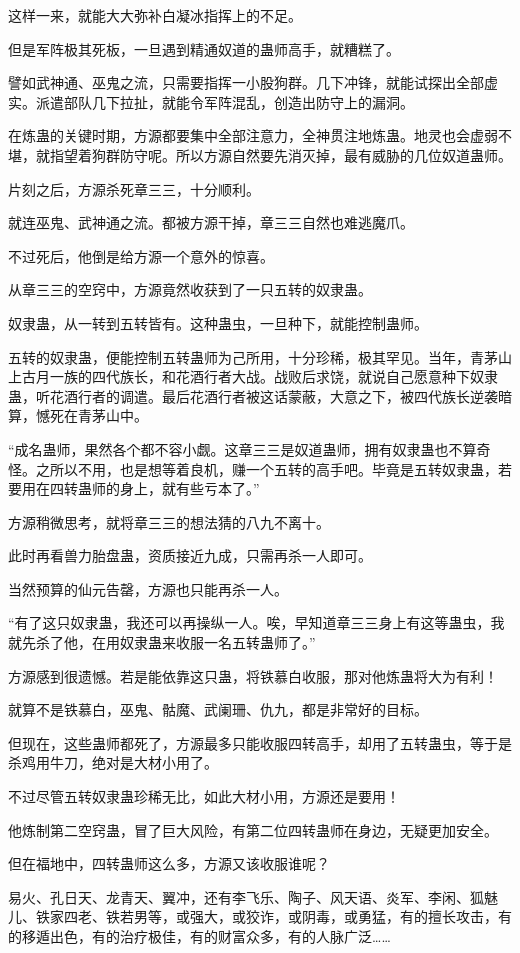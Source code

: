 \begin{this_body}
这样一来，就能大大弥补白凝冰指挥上的不足。

但是军阵极其死板，一旦遇到精通奴道的蛊师高手，就糟糕了。

譬如武神通、巫鬼之流，只需要指挥一小股狗群。几下冲锋，就能试探出全部虚实。派遣部队几下拉扯，就能令军阵混乱，创造出防守上的漏洞。

在炼蛊的关键时期，方源都要集中全部注意力，全神贯注地炼蛊。地灵也会虚弱不堪，就指望着狗群防守呢。所以方源自然要先消灭掉，最有威胁的几位奴道蛊师。

片刻之后，方源杀死章三三，十分顺利。

就连巫鬼、武神通之流。都被方源干掉，章三三自然也难逃魔爪。

不过死后，他倒是给方源一个意外的惊喜。

从章三三的空窍中，方源竟然收获到了一只五转的奴隶蛊。

奴隶蛊，从一转到五转皆有。这种蛊虫，一旦种下，就能控制蛊师。

五转的奴隶蛊，便能控制五转蛊师为己所用，十分珍稀，极其罕见。当年，青茅山上古月一族的四代族长，和花酒行者大战。战败后求饶，就说自己愿意种下奴隶蛊，听花酒行者的调遣。最后花酒行者被这话蒙蔽，大意之下，被四代族长逆袭暗算，憾死在青茅山中。

“成名蛊师，果然各个都不容小觑。这章三三是奴道蛊师，拥有奴隶蛊也不算奇怪。之所以不用，也是想等着良机，赚一个五转的高手吧。毕竟是五转奴隶蛊，若要用在四转蛊师的身上，就有些亏本了。”

方源稍微思考，就将章三三的想法猜的八九不离十。

此时再看兽力胎盘蛊，资质接近九成，只需再杀一人即可。

当然预算的仙元告罄，方源也只能再杀一人。

“有了这只奴隶蛊，我还可以再操纵一人。唉，早知道章三三身上有这等蛊虫，我就先杀了他，在用奴隶蛊来收服一名五转蛊师了。”

方源感到很遗憾。若是能依靠这只蛊，将铁慕白收服，那对他炼蛊将大为有利！

就算不是铁慕白，巫鬼、骷魔、武阑珊、仇九，都是非常好的目标。

但现在，这些蛊师都死了，方源最多只能收服四转高手，却用了五转蛊虫，等于是杀鸡用牛刀，绝对是大材小用了。

不过尽管五转奴隶蛊珍稀无比，如此大材小用，方源还是要用！

他炼制第二空窍蛊，冒了巨大风险，有第二位四转蛊师在身边，无疑更加安全。

但在福地中，四转蛊师这么多，方源又该收服谁呢？

易火、孔日天、龙青天、翼冲，还有李飞乐、陶子、风天语、炎军、李闲、狐魅儿、铁家四老、铁若男等，或强大，或狡诈，或阴毒，或勇猛，有的擅长攻击，有的移遁出色，有的治疗极佳，有的财富众多，有的人脉广泛……


\end{this_body}
